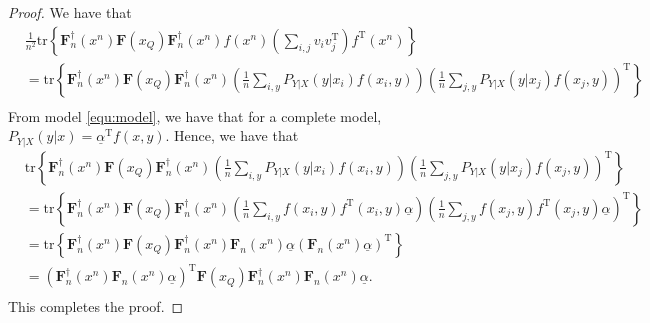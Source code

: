 \documentclass{article} %
\theoremstyle{plain} %
\begin{document}
\begin{proof}
We have that
\begin{align*}
& \frac1{n^2}\mathrm{tr}\left\{ \mathbf{F}_n^{\dagger}(x^n)\mathbf{F}(x_Q)\mathbf{F}_n^{\dagger}(x^n) f(x^n)\left(\sum_{i,j}v_iv_j^\mathrm{T}\right) f^\mathrm{T}(x^n)\right\}\\
& = \mathrm{tr}\left\{ \mathbf{F}_n^{\dagger}(x^n)\mathbf{F}(x_Q)\mathbf{F}_n^{\dagger}(x^n)\left(\frac1n\sum_{i,y}P_{Y|X}(y|x_i) f(x_i, y)\right)\left(\frac1n\sum_{j,y} P_{Y|X}(y|x_j)f(x_j,y)\right)^\mathrm{T}\right\}\\
\end{align*}
From model \ref{equ:model}, we have that for a complete model, $P_{Y|X}(y|x) = \underline{\alpha}^\mathrm{T}f(x,y)$. Hence, we have that
\begin{align*}
& \mathrm{tr}\left\{ \mathbf{F}_n^{\dagger}(x^n)\mathbf{F}(x_Q)\mathbf{F}_n^{\dagger}(x^n)\left(\frac1n\sum_{i,y}P_{Y|X}(y|x_i) f(x_i, y)\right)\left(\frac1n\sum_{j,y} P_{Y|X}(y|x_j) f(x_j,y)\right)^\mathrm{T}\right\}\\
& = \mathrm{tr}\left\{\mathbf{F}_n^{\dagger}(x^n) \mathbf{F}(x_Q)\mathbf{F}_n^{\dagger}(x^n)\left(\frac1n\sum_{i,y} f(x_i, y)f^\mathrm{T}(x_i, y) \underline{\alpha} \right)\left(\frac1n\sum_{j,y} f(x_j,y)f^\mathrm{T}(x_j,y)\underline{\alpha}\right)^\mathrm{T}\right\}\\
& = \mathrm{tr}\left\{\mathbf{F}_n^{\dagger}(x^n) \mathbf{F}(x_Q)\mathbf{F}_n^{\dagger}(x^n)\mathbf{F}_n(x^n) \underline{\alpha} \left(\mathbf{F}_n(x^n)\underline{\alpha}\right)^\mathrm{T}\right\}\\
& = \left(\mathbf{F}_n^{\dagger}(x^n)\mathbf{F}_n(x^n)\underline{\alpha}\right)^\mathrm{T}\mathbf{F}(x_Q) \mathbf{F}_n^{\dagger}(x^n)\mathbf{F}_n(x^n)\underline{\alpha}.\\
\end{align*}
This completes the proof.
\end{proof}
\end{document}
